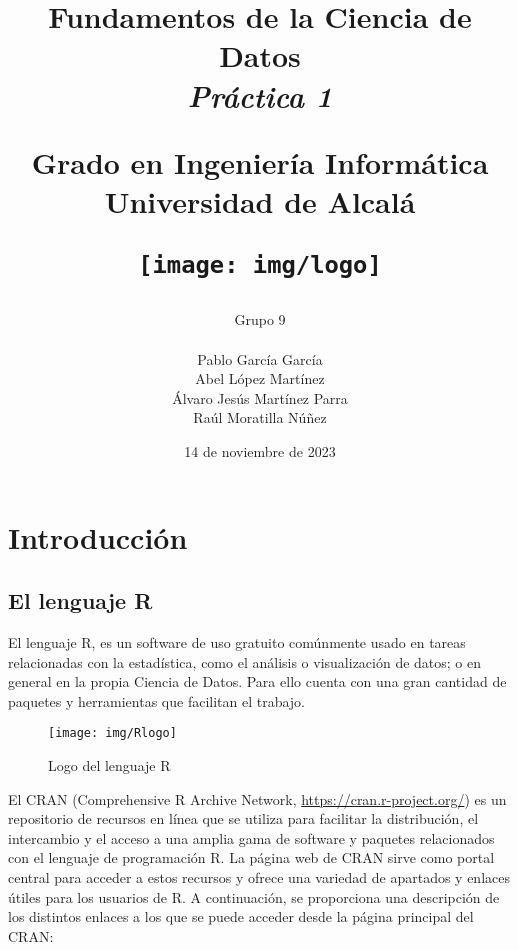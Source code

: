 \documentclass[12pt]{report}\usepackage[]{graphicx}\usepackage[dvipsnames]{xcolor}
\title{
	\huge
	\noindent\textbf{Fundamentos de la Ciencia de Datos}\\
	
	{\Large \textit{Práctica 1}}
	\vspace{1cm}
	
	\huge
	Grado en Ingeniería Informática\\
	Universidad de Alcalá\\
	
	\vspace{1cm}
	
	\texttt{[image: img/logo]}
}
\author{
	Grupo 9\\\\
	Pablo García García\\
	Abel López Martínez\\
	Álvaro Jesús Martínez Parra\\
	Raúl Moratilla Núñez
}
\date{
	\large{14 de noviembre de 2023}
}
\begin{document}
	
	\renewcommand{\chaptername}{Parte}
	\renewcommand{\lstlistingname}{Código}
	\maketitle \thispagestyle{empty}
	
	\newpage
	
	\setcounter{tocdepth}{3}
	\tableofcontents
	\listoffigures
	
	\chapter*{Introducción}\pagestyle{plain}
	
		\section*{El lenguaje R}
		
			El lenguaje R, es un software de uso gratuito comúnmente usado en tareas relacionadas con la estadística, como el análisis o visualización de datos; o en general en la propia Ciencia de Datos. Para ello cuenta con una gran cantidad de paquetes y herramientas que facilitan el trabajo.   
			
			\begin{figure}[H]
				\centering
				\texttt{[image: img/Rlogo]}
				\caption{Logo del lenguaje R}
				\label{fig:logo_R}
			\end{figure}
		
			El CRAN (Comprehensive R Archive Network, \url{https://cran.r-project.org/}) es un repositorio de recursos en línea que se utiliza para facilitar la distribución, el intercambio y el acceso a una amplia gama de software y paquetes relacionados con el lenguaje de programación R. La página web de CRAN sirve como portal central para acceder a estos recursos y ofrece una variedad de apartados y enlaces útiles para los usuarios de R. A continuación, se proporciona una descripción de los distintos enlaces a los que se puede acceder desde la página principal del CRAN:
			
\end{document}
